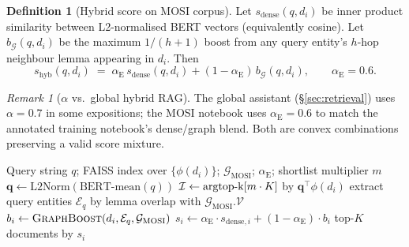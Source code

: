 \documentclass[12pt,a4paper]{article}
\theoremstyle{definition}
\newtheorem{definition}{Definition}[section]
\theoremstyle{plain}
\theoremstyle{remark}
\newtheorem{remark}{Remark}[section]
\newcommand{\KG}{\mathcal{G}}
\newcommand{\argtopk}{\operatornamewithlimits{argtop\text{-}k}}
\begin{document}
\begin{definition}[Hybrid score on MOSI corpus]
Let $s_{\text{dense}}(q,d_i)$ be inner product similarity between L2-normalised BERT vectors (equivalently cosine). Let $b_{\KG}(q,d_i)$ be the maximum $1/(h{+}1)$ boost from any query entity's $h$-hop neighbour lemma appearing in $d_i$. Then
\begin{equation}
  s_{\text{hyb}}(q,d_i) \;=\; \alpha_{\text{E}}\, s_{\text{dense}}(q,d_i) + (1-\alpha_{\text{E}})\, b_{\KG}(q,d_i),
  \qquad \alpha_{\text{E}} = 0.6.
\end{equation}
\end{definition}

\begin{remark}[$\alpha$ vs.\ global hybrid RAG]
The global assistant (\S\ref{sec:retrieval}) uses $\alpha=0.7$ in some expositions; the MOSI notebook uses $\alpha_{\text{E}}=0.6$ to match the annotated training notebook's dense/graph blend. Both are convex combinations preserving a valid score mixture.
\end{remark}

\begin{algorithm}[H]
\caption{Hybrid retrieval over CMU-MOSI training transcripts (notebook)}
\label{alg:mosi_hybrid_rag}
\begin{algorithmic}[1]
\Require Query string $q$; FAISS index over $\{\phi(d_i)\}$; $\KG_{\text{MOSI}}$; $\alpha_{\text{E}}$; shortlist multiplier $m$
\State $\mathbf{q} \gets \mathrm{L2Norm}(\text{BERT-mean}(q))$
\State $\mathcal{I} \gets \argtopk[m\cdot K]$ by $\mathbf{q}^\top \phi(d_i)$ 
\State extract query entities $\mathcal{E}_q$ by lemma overlap with $\KG_{\text{MOSI}}.\mathcal{V}$
  \State $b_i \gets \textsc{GraphBoost}(d_i, \mathcal{E}_q, \KG_{\text{MOSI}})$ 
  \State $s_i \gets \alpha_{\text{E}} \cdot s_{\text{dense},i} + (1-\alpha_{\text{E}}) \cdot b_i$
\EndFor
\State \Return top-$K$ documents by $s_i$
\end{algorithmic}
\end{algorithm}
\end{document}
